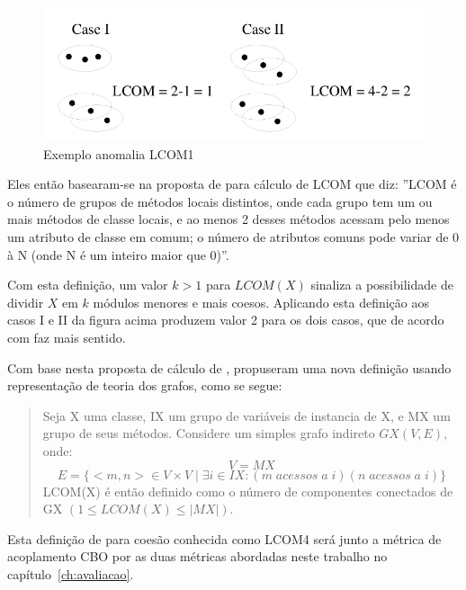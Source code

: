 \begin{figure}[h]
\center
\includegraphics[scale=0.4]{imagens/exemplo-anomalia-lcom1-hitz-e-montazeri}
\caption{Exemplo anomalia LCOM1 \cite{measuringCouplingAndCohesion}}
\label{fig:exemplo-anomalia-lcom1}
\end{figure}

Eles então basearam-se na proposta de
 para cálculo de LCOM
que diz: ''LCOM é o número de grupos de métodos locais distintos, onde cada
grupo tem um ou mais métodos de classe locais, e ao menos 2 desses métodos
acessam pelo menos um atributo de classe em comum; o número de atributos comuns
pode variar de 0 à N (onde N é um inteiro maior que 0)''.

Com esta definição, um valor $k > 1$ para $LCOM(X)$ sinaliza a possibilidade de
dividir $X$ em $k$ módulos menores e mais coesos. Aplicando esta definição aos
casos I e II da figura acima produzem valor 2 para os dois casos, que de acordo
com  faz mais sentido.

Com base nesta proposta de cálculo de
,
 propuseram uma nova definição usando
representação de teoria dos grafos, como se segue:

\begin{quotation}
Seja X uma classe, IX um grupo de variáveis de instancia de X, e MX um grupo
de seus métodos. Considere um simples grafo indireto $GX(V, E)$, onde: $$V =
MX$$ $$E = \{<m, n> \in V \times V \mid \exists i \in IX: (m \; acessos \; a \;
i) (n \; acessos \; a \; i)\}$$ LCOM(X) é então definido como o número de componentes
conectados de GX $(1 \leq LCOM(X) \leq |MX|)$.
\end{quotation}

Esta definição de  para coesão
conhecida como LCOM4 será junto a métrica de acoplamento CBO por
 as duas métricas abordadas neste trabalho no
capítulo~\ref{ch:avaliacao}.

